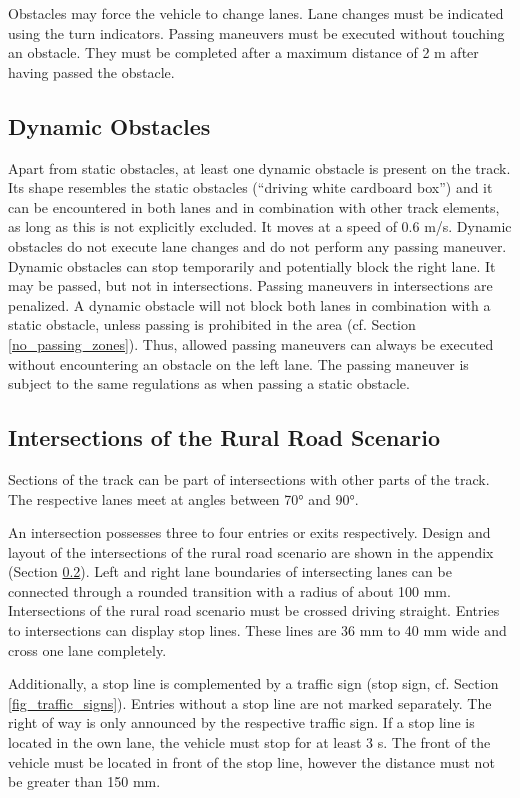 \documentclass[a4paper]{report}
\begin{document}
{{Obstacles may force the vehicle to change lanes. Lane changes must be indicated using the turn indicators. Passing maneuvers must be executed without touching an obstacle. They must be completed after a maximum distance of 2 m after having passed the obstacle. 

\subsection{Dynamic Obstacles}

Apart from static obstacles, at least one dynamic obstacle is present on the track. Its shape resembles the static obstacles (“driving white cardboard box”) and it can be encountered in both lanes and in combination with other track elements, as long as this is not explicitly excluded. It moves at a speed of 0.6 m/s. Dynamic obstacles do not execute lane changes and do not perform any passing maneuver. Dynamic obstacles can stop temporarily and potentially block the right lane. It may be passed, but not in intersections. Passing maneuvers in intersections are penalized. A dynamic obstacle will not block both lanes in combination with a static obstacle, unless passing is prohibited in the area (cf. Section \ref{no_passing_zones}). Thus, allowed passing maneuvers can always be executed without encountering an obstacle on the left lane. The passing maneuver is subject to the same regulations as when passing a static obstacle. 

\subsection{Intersections of the Rural Road Scenario}
\label{intersection_rural}

Sections of the track can be part of intersections with other parts of the track. The respective lanes meet at angles between 70° and 90°. 

An intersection possesses three to four entries or exits respectively. Design and layout of the intersections of the rural road scenario are shown in the appendix (Section \ref{intersection_rural}). Left and right lane boundaries of intersecting lanes can be connected through a rounded transition with a radius of about 100 mm. Intersections of the rural road scenario must be crossed driving straight. Entries to intersections can display stop lines. These lines are 36 mm to 40 mm wide and cross one lane completely.

Additionally, a stop line is complemented by a traffic sign (stop sign, cf. Section \ref{fig_traffic_signs}). Entries without a stop line are not marked separately. The right of way is only announced by the respective traffic sign. If a stop line is located in the own lane, the vehicle must stop for at least 3 s. The front of the vehicle must be located in front of the stop line, however the distance must not be greater than 150 mm. 

}}
\end{document}
